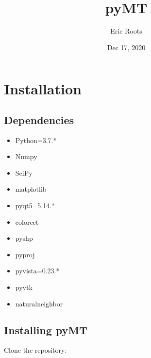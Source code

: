 \documentclass[letterpaper,10pt,english]{sphinxmanual}
\title{pyMT}
\date{Dec 17, 2020}
\author{Eric Roots}
\begin{document}
\pagestyle{empty}
\sphinxmaketitle
\pagestyle{plain}
\sphinxtableofcontents
\pagestyle{normal}
\label{\detokenize{index::doc}}



\chapter{Installation}
\label{\detokenize{content/api_core/installation:installation}}\label{\detokenize{content/api_core/installation::doc}}

\section{Dependencies}
\label{\detokenize{content/api_core/installation:dependencies}}\begin{itemize}
\item {} 
Python=3.7.*

\item {} 
Numpy

\item {} 
SciPy

\item {} 
matplotlib

\item {} 
pyqt5=5.14.*

\item {} 
colorcet

\item {} 
pyshp

\item {} 
pyproj

\item {} 
pyvista=0.23.*

\item {} 
pyvtk

\item {} 
naturalneighbor

\end{itemize}


\section{Installing pyMT}
\label{\detokenize{content/api_core/installation:installing-pymt}}
Clone the repository:

\begin{sphinxVerbatim}[commandchars=\\\{\}]
  
\end{sphinxVerbatim}
\end{document}
